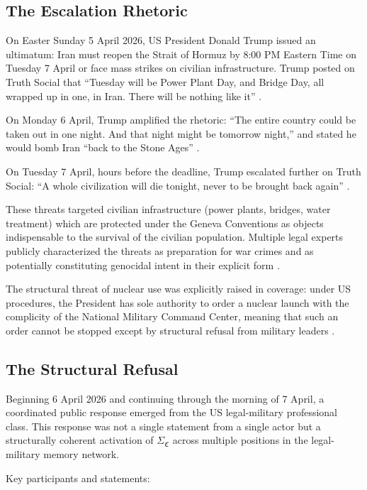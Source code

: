\documentclass[12pt,a4paper]{article}
\newcommand{\SigmaCF}{\Sigma_{\mathfrak{C}}}  %
\begin{document}
\subsection{The Escalation Rhetoric}

On Easter Sunday 5 April 2026, US President Donald Trump issued an ultimatum: Iran must reopen the Strait of Hormuz by 8:00 PM Eastern Time on Tuesday 7 April or face mass strikes on civilian infrastructure. Trump posted on Truth Social that ``Tuesday will be Power Plant Day, and Bridge Day, all wrapped up in one, in Iran. There will be nothing like it'' \cite{justsec_war_crimes}.

On Monday 6 April, Trump amplified the rhetoric: ``The entire country could be taken out in one night. And that night might be tomorrow night,'' and stated he would bomb Iran ``back to the Stone Ages'' \cite{intercept_trump}.

On Tuesday 7 April, hours before the deadline, Trump escalated further on Truth Social: ``A whole civilization will die tonight, never to be brought back again'' \cite{intercept_trump}.

These threats targeted civilian infrastructure (power plants, bridges, water treatment) which are protected under the Geneva Conventions as objects indispensable to the survival of the civilian population. Multiple legal experts publicly characterized the threats as preparation for war crimes and as potentially constituting genocidal intent in their explicit form \cite{intercept_trump,wapo_war_crime}.

The structural threat of nuclear use was explicitly raised in coverage: under US procedures, the President has sole authority to order a nuclear launch with the complicity of the National Military Command Center, meaning that such an order cannot be stopped except by structural refusal from military leaders \cite{nationaltoday_dilemma}.

\subsection{The Structural Refusal}

Beginning 6 April 2026 and continuing through the morning of 7 April, a coordinated public response emerged from the US legal-military professional class. This response was not a single statement from a single actor but a structurally coherent activation of $\SigmaCF$ across multiple positions in the legal-military memory network.

Key participants and statements:
\end{document}

